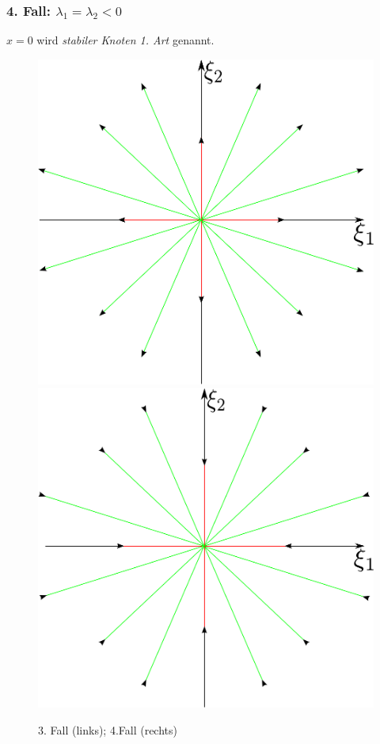 \documentclass[a4paper, 13pt]{scrreprt}
\theoremstyle{definition} \newtheorem{definition}{Definition}[section]
\begin{document}
\subsubsection{4. Fall: $\lambda_1 = \lambda_2 < 0$ }
\( x = 0\) wird \emph{stabiler Knoten 1. Art} genannt.
	\begin{figure}[htpb]
		\centering
		\includegraphics[height=0.20\textheight]{img/lin_sys/lin_sys_3.pdf}
		\includegraphics[height=0.20\textheight]{img/lin_sys/lin_sys_4.pdf}
		\caption{3. Fall (links); 4.Fall (rechts)}
	\end{figure}
\end{document}
